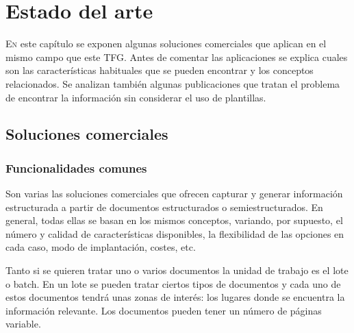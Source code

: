
\chapter{Estado del arte}
\label{chap:estado-arte}

\lettrine{E}{n} este capítulo se exponen algunas soluciones comerciales que aplican en el mismo campo que este TFG. Antes de comentar las aplicaciones se explica cuales son las características habituales que se pueden encontrar y los conceptos relacionados. Se analizan también algunas publicaciones que tratan el problema de encontrar la información sin considerar el uso de plantillas.

\section{Soluciones comerciales}

\subsection{Funcionalidades comunes}

Son varias las soluciones comerciales que ofrecen capturar y generar información estructurada a partir de documentos estructurados o semiestructurados. En general, todas ellas se basan en los mismos conceptos, variando, por supuesto, el número y calidad de características disponibles, la flexibilidad de las opciones en cada caso, modo de implantación, costes, etc.

Tanto si se quieren tratar uno o varios documentos la unidad de trabajo es el lote o batch. En un lote se pueden tratar ciertos tipos de documentos y cada uno de estos documentos tendrá unas zonas de interés: los lugares donde se encuentra la información relevante. Los documentos pueden tener un número de páginas variable.

